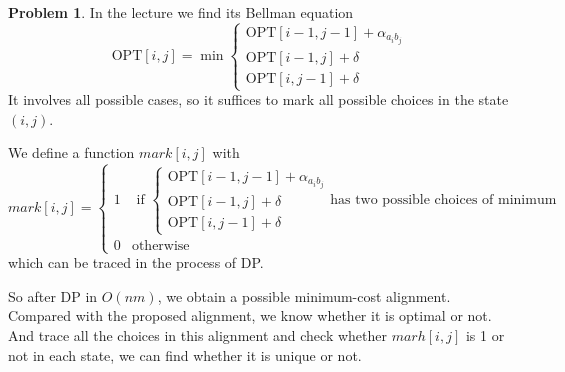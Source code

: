 \documentclass[a4paper]{article}
\theoremstyle{definition}
\newtheorem{problem}{Problem}
\theoremstyle{plain}
\newcommand{\OPT}{\mathrm{OPT}}
\numberwithin{equation}{problem}
\begin{document}
\begin{problem}
    In the lecture we find its Bellman equation 
    \[\OPT[i,j]=\min\begin{cases}
    \OPT[i-1,j-1]+\alpha_{a_ib_j}\\
    \OPT[i-1,j]+\delta\\
    \OPT[i,j-1]+\delta
\end{cases}\]
It involves all possible cases, so it suffices to mark all possible choices in the state  $ (i,j) $.

We define a function  $ mark[i,j]  $ with 
\[mark[i,j]=\begin{cases}
    1&\text{ if }\begin{cases}
        \OPT[i-1,j-1]+\alpha_{a_ib_j}\\
        \OPT[i-1,j]+\delta\\
        \OPT[i,j-1]+\delta
    \end{cases} \text{has two possible choices of minimum}\\
    0&\text{otherwise}
\end{cases}\]
which can be traced in the process of DP.

So after DP in  $ O(nm) $,  we obtain a possible minimum-cost alignment. Compared with the proposed alignment, we know whether it is optimal or not. And trace all the choices in this alignment and check whether  $ marh[i,j] $ is 1 or not in each state, we can find whether it is unique or not. 
\end{problem}
\end{document}
